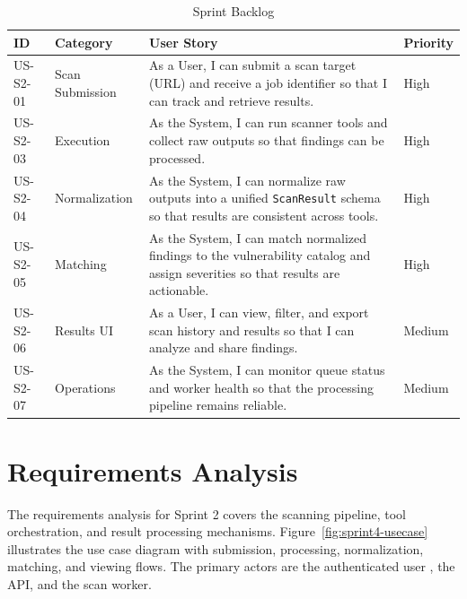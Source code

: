 \begin{table}[H]
    \centering
    \caption{Sprint Backlog}
    \renewcommand{\arraystretch}{1.35}
    \small
    \setlength{\tabcolsep}{8pt}
    \begin{tabularx}{\textwidth}{|>{\centering\arraybackslash}p{1.6cm}|>{\centering\arraybackslash}p{2.2cm}|>{\raggedright\arraybackslash}X|>{\centering\arraybackslash}p{1.2cm}|}
        \hline
        \textbf{ID} & \textbf{Category} & \textbf{User Story} & \textbf{Priority} \\
        \hline
        US-S2-01 & Scan Submission & As a User, I can submit a scan target (URL) and receive a job identifier so that I can track and retrieve results. & High \\
        \hline
        US-S2-03 & Execution & As the System, I can run scanner tools and collect raw outputs so that findings can be processed. & High \\
        \hline
        US-S2-04 & Normalization & As the System, I can normalize raw outputs into a unified \texttt{ScanResult} schema so that results are consistent across tools. & High \\
        \hline
        US-S2-05 & Matching & As the System, I can match normalized findings to the vulnerability catalog and assign severities so that results are actionable. & High \\
        \hline
        US-S2-06 & Results UI & As a User, I can view, filter, and export scan history and results so that I can analyze and share findings. & Medium \\
        \hline
        US-S2-07 & Operations & As the System, I can monitor queue status and worker health so that the processing pipeline remains reliable. & Medium \\
        \hline
    \end{tabularx}
\end{table}

\section{Requirements Analysis}

\justifying
The requirements analysis for Sprint 2 covers the scanning pipeline, tool orchestration, and result processing mechanisms. Figure~\ref{fig:sprint4-usecase} illustrates the use case diagram with submission, processing, normalization, matching, and viewing flows. The primary actors are the authenticated user , the API, and the scan worker.


